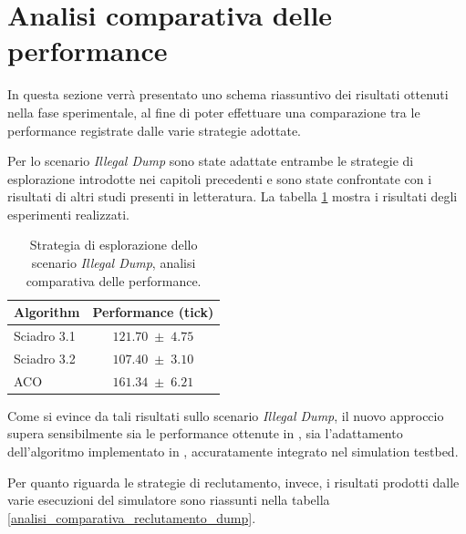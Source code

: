 \newpage
\section{Analisi comparativa delle performance}

In questa sezione verrà presentato uno schema riassuntivo dei risultati ottenuti nella fase sperimentale, al fine di poter effettuare una comparazione tra le performance registrate dalle varie strategie adottate.

Per lo scenario \textit{Illegal Dump} sono state adattate entrambe le strategie di esplorazione introdotte nei capitoli precedenti e sono state confrontate con i risultati di altri studi presenti in letteratura.
La tabella \ref{analisi_comparativa_esplorazione_dump} mostra i risultati degli esperimenti realizzati.

\begin{table}[H]
    \centering
    \captionsetup{justification=centering, margin=2cm, font=footnotesize}
    \begin{tabular}{|l|c|}
    \hline
    \textbf{Algorithm}              & \textbf{Performance (tick)}       \\ \hline
    Sciadro 3.1                     & $121.70 \; \pm \; 4.75$           \\ \hline
    Sciadro 3.2                     & $107.40 \; \pm \; 3.10$           \\ \hline
    ACO                             & $161.34 \; \pm \; 6.21$           \\ \hline
    \end{tabular}%
    
    \caption{Strategia di esplorazione dello scenario \textit{Illegal Dump}, analisi comparativa delle performance.}
    \label{analisi_comparativa_esplorazione_dump}
\end{table}

Come si evince da tali risultati sullo scenario \textit{Illegal Dump}, il nuovo approccio supera sensibilmente sia le performance ottenute in \cite{cimino2019adaptive}, sia l'adattamento dell'algoritmo implementato in \cite{palmieri2017comparison}, accuratamente integrato nel simulation testbed.

Per quanto riguarda le strategie di reclutamento, invece, i risultati prodotti dalle varie esecuzioni del simulatore sono riassunti nella tabella \ref{analisi_comparativa_reclutamento_dump}.

